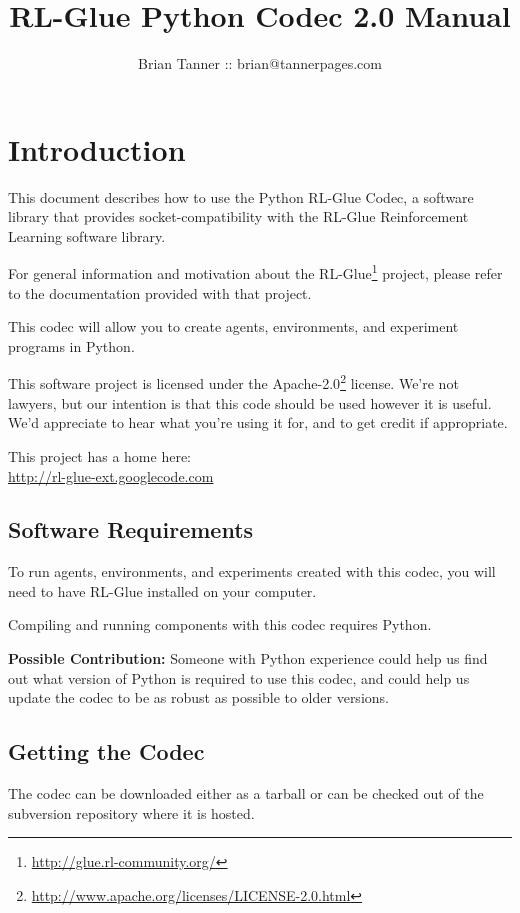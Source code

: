 \documentclass[11pt]{article}
\title{RL-Glue Python Codec 2.0 Manual }
\author{Brian Tanner ::  brian@tannerpages.com}
\date{}
\begin{document}
\maketitle
\tableofcontents

\section{Introduction}

This document describes how to use the Python RL-Glue Codec, a software library that provides socket-compatibility with the RL-Glue Reinforcement Learning software library.  

For general information and motivation about the RL-Glue\footnote{\url{http://glue.rl-community.org/}} project, please refer to the documentation provided with that project.

This codec will allow you to create agents, environments, and experiment programs in Python.

This software project is licensed under the Apache-2.0\footnote{\url{http://www.apache.org/licenses/LICENSE-2.0.html}} license. We're not lawyers, but our intention is that this code 
should be used however it is useful.  We'd appreciate to hear what you're using it for, and to get credit if appropriate.

This project has a home here:\\
\url{http://rl-glue-ext.googlecode.com}


\subsection{Software Requirements}
To run agents, environments, and experiments created with this codec, you will need to have RL-Glue installed on your computer.

Compiling and running components with this codec requires Python.

\textbf{Possible Contribution: }Someone with Python experience could help us find out what version of Python is required to use this codec, and could help us update the codec
to be as robust as possible to older versions.

\subsection{Getting the Codec}
The codec can be downloaded either as a tarball or can be checked out of the subversion repository where it is hosted.
\end{document}

